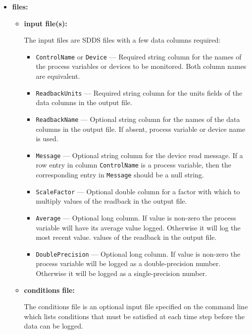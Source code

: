 \begin{itemize}
\begin{verbatim}
    [-verbose] [-singleshot{=noprompt | stdout}]
    [-precision={single|double}]
    -onerror={usezero|skiprow|exit} [-pendIOtime=<value>]
    [-conditions=<filename>,{allMustPass | oneMustPass}[,touchOutput][,retakeStep]]
Writes values of process variables or devices to a binary SDDS file.
\end{verbatim}
\item {\bf files:}
\begin{itemize}
\item {\bf input file(s):}\par
The input files are SDDS files with a few data columns required:
\begin{itemize}
        \item {\tt ControlName} or {\tt Device} --- Required string column for the names of the process variables
                or devices to be monitored. Both column names are equivalent.
        \item {\tt ReadbackUnits} --- Required string column for the units fields of the data columns in the 
                output file.
        \item {\tt ReadbackName} --- Optional string column for the names of the data columns in the 
                output file. If absent, process variable or device name is used.
        \item {\tt Message} --- Optional string column for the device read message. If a row entry in
                column {\tt ControlName} is a process variable, then the corresponding entry
                in {\tt Message} should be a null string. 
        \item {\tt ScaleFactor} --- Optional double column for a factor with which to multiply
                values of the readback in the output file.
        \item {\tt Average} --- Optional long column.  If value is non-zero the process variable will have
	        its average value logged.  Otherwise it will log the most recent value.
                values of the readback in the output file.
        \item {\tt DoublePrecision} --- Optional long column. If value is non-zero the process variable 
	        will be logged as a double-precision number.  Otherwise it will be logged as a single-precision
	        number.
\end{itemize}

\item {\bf conditions file:} \par
The conditions file is an optional input file specified on the command line which lists
conditions that must be satisfied at each time step before the data can be logged.


\end{itemize}
\end{itemize}
